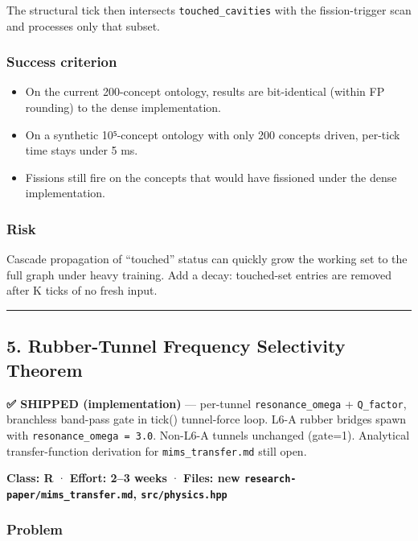 \documentclass[
  11pt,
  a4paper,
]{article}
\providecommand{\tightlist}{%
  \setlength{\itemsep}{0pt}\setlength{\parskip}{0pt}}
\begin{document}
The structural tick then intersects \texttt{touched\_cavities} with the
fission-trigger scan and processes only that subset.

\subsubsection{Success criterion}\label{success-criterion-3}

\begin{itemize}
\tightlist
\item
  On the current 200-concept ontology, results are bit-identical (within
  FP rounding) to the dense implementation.
\item
  On a synthetic 10⁵-concept ontology with only 200 concepts driven,
  per-tick time stays under 5 ms.
\item
  Fissions still fire on the concepts that would have fissioned under
  the dense implementation.
\end{itemize}

\subsubsection{Risk}\label{risk-1}

Cascade propagation of ``touched'' status can quickly grow the working
set to the full graph under heavy training. Add a decay: touched-set
entries are removed after K ticks of no fresh input.

\begin{center}\rule{0.5\linewidth}{0.5pt}\end{center}

\subsection{5. Rubber-Tunnel Frequency Selectivity
Theorem}\label{rubber-tunnel-frequency-selectivity-theorem}

\textbf{✅ SHIPPED (implementation)} --- per-tunnel
\texttt{resonance\_omega} + \texttt{Q\_factor}, branchless band-pass
gate in tick() tunnel-force loop. L6-A rubber bridges spawn with
\texttt{resonance\_omega\ =\ 3.0}. Non-L6-A tunnels unchanged (gate=1).
Analytical transfer-function derivation for \texttt{mims\_transfer.md}
still open.

\textbf{Class: R} · \textbf{Effort: 2--3 weeks} · \textbf{Files: new
\texttt{research-paper/mims\_transfer.md}, \texttt{src/physics.hpp}}

\subsubsection{Problem}\label{problem-4}
\end{document}
